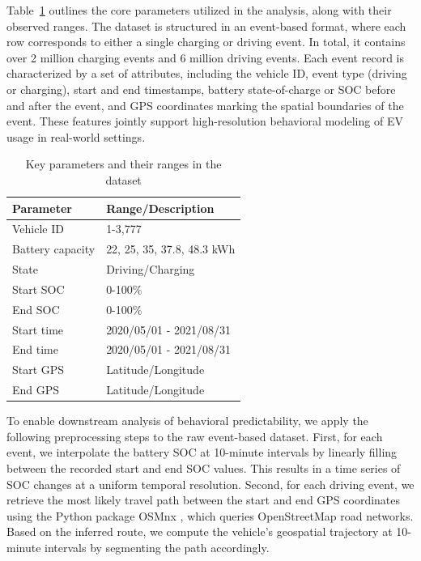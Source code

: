 \documentclass[12pt,review,authoryear]{elsarticle}
\theoremstyle{upright}
\begin{document}
Table~\ref{tab:dataset-parameters} outlines the core parameters utilized in the analysis, along with their observed ranges. The dataset is structured in an event-based format, where each row corresponds to either a single charging or driving event. In total, it contains over 2 million charging events and 6 million driving events. Each event record is characterized by a set of attributes, including the vehicle ID, event type (driving or charging), start and end timestamps, battery state-of-charge or SOC before and after the event, and GPS coordinates marking the spatial boundaries of the event. These features jointly support high-resolution behavioral modeling of EV usage in real-world settings.

\begin{table}[htbp!]
  \centering
  \caption{Key parameters and their ranges in the dataset}
  \vspace{2pt}
  \small %
  \begin{tabular}{ll}
    \toprule
    \textbf{Parameter} & \textbf{Range/Description} \\
    \midrule
    Vehicle ID         & 1-3,777 \\
    Battery capacity   & 22, 25, 35, 37.8, 48.3 kWh \\
    State              & Driving/Charging \\
    Start SOC          & 0-100\% \\
    End SOC            & 0-100\% \\
    Start time         & 2020/05/01 - 2021/08/31 \\
    End time           & 2020/05/01 - 2021/08/31 \\
    Start GPS          & Latitude/Longitude \\
    End GPS            & Latitude/Longitude \\
    \bottomrule
  \end{tabular}
  \vspace{2pt}
  \label{tab:dataset-parameters}
\end{table}
To enable downstream analysis of behavioral predictability, we apply the following preprocessing steps to the raw event-based dataset. First, for each event, we interpolate the battery SOC at 10-minute intervals by linearly filling between the recorded start and end SOC values. This results in a time series of SOC changes at a uniform temporal resolution. Second, for each driving event, we retrieve the most likely travel path between the start and end GPS coordinates using the Python package OSMnx \citep{boeing2017osmnx}, which queries OpenStreetMap road networks. Based on the inferred route, we compute the vehicle’s geospatial trajectory at 10-minute intervals by segmenting the path accordingly.
\end{document}
